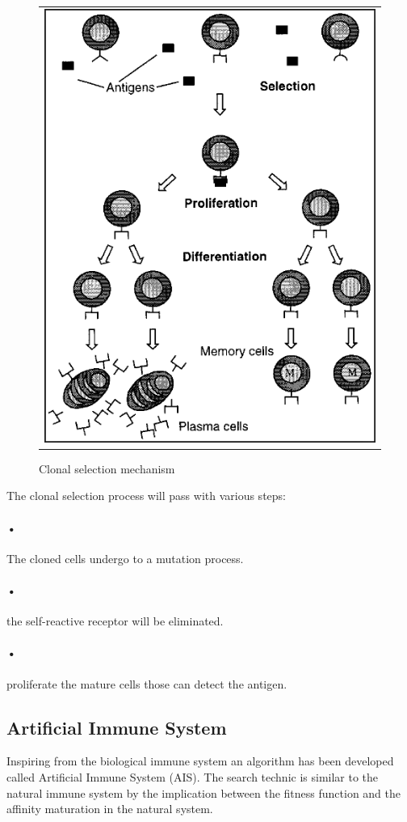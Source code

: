 \documentclass[conference]{IEEEtran}
\begin{document}
\begin{figure}
\begin{tabular}{c}
\includegraphics[scale = 0.8]{clonaS}
\end{tabular}
\caption{Clonal selection mechanism}
\end{figure}

The clonal selection process will pass with various steps\cite{doc7}:
\paragraph{•}
The cloned cells undergo to a mutation process.
\paragraph{•}
the self-reactive receptor will be eliminated.
\paragraph{•}
proliferate the mature cells those can detect the antigen.

\subsection{Artificial Immune System}
Inspiring from the biological immune system an algorithm has been developed called Artificial Immune System (AIS)\cite{doc6}. The search technic is similar to the natural immune system by the implication between the fitness function and the affinity maturation in the natural system.
\end{document}
